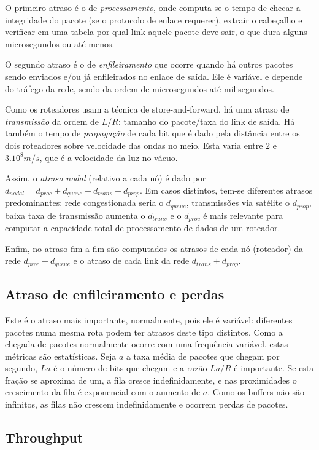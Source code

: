 O primeiro atraso é o de \emph{processamento}, onde computa-se o tempo de checar a integridade do pacote (se o protocolo de enlace requerer), extrair o cabeçalho e verificar em uma tabela por qual link aquele pacote deve sair, o que dura alguns microsegundos ou até menos.

O segundo atraso é o de \emph{enfileiramento} que ocorre quando há outros pacotes sendo enviados e/ou já enfileirados no enlace de saída. 
Ele é variável e depende do tráfego da rede, sendo da ordem de microsegundos até milisegundos.

Como os roteadores usam a técnica de store-and-forward, há uma atraso de \emph{transmissão} da ordem de $L/R$: tamanho do pacote/taxa do link de saída.
Há também o tempo de \emph{propagação} de cada bit que é dado pela distância entre os dois roteadores sobre velocidade das ondas no meio.
Esta varia entre $2$ e $3 . 10^8 m/s$, que é a velocidade da luz no vácuo.

Assim, o \emph{atraso nodal} (relativo a cada nó) é dado por $d_{nodal} = d_{proc} + d_{queue} + d_{trans} + d_{prop}$.
Em casos distintos, tem-se diferentes atrasos predominantes: rede congestionada seria o $d_{queue}$, transmissões via satélite o $d_{prop}$, baixa taxa de transmissão aumenta o $d_{trans}$ e o $d_{proc}$ é mais relevante para computar a capacidade total de processamento de dados de um roteador.

Enfim, no atraso fim-a-fim são computados os atrasos de cada nó (roteador) da rede $d_{proc} + d_{queue}$ 
e o atraso de cada link da rede $d_{trans} + d_{prop}$.

\subsection{Atraso de enfileiramento e perdas}

Este é o atraso mais importante, normalmente, pois ele é variável: diferentes pacotes numa mesma rota podem ter atrasos deste tipo distintos.
Como a chegada de pacotes normalmente ocorre com uma frequência variável, estas métricas são estatísticas.
Seja $a$ a taxa média de pacotes que chegam por segundo, $La$ é o número de bits que chegam e a razão $La/R$ é importante.
Se esta fração se aproxima de um, a fila cresce indefinidamente, e nas proximidades o crescimento da fila é exponencial com o aumento de $a$.
Como os buffers não são infinitos, as filas não crescem indefinidamente e ocorrem perdas de pacotes.

\subsection{Throughput}


